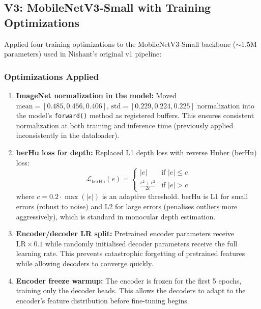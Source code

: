 \documentclass[11pt,a4paper]{article}
\begin{document}
\subsection{V3: MobileNetV3-Small with Training Optimizations}
\label{sec:vivek-v3}

Applied four training optimizations to the MobileNetV3-Small backbone
($\sim$1.5M parameters) used in Nishant's original v1 pipeline:

\subsubsection{Optimizations Applied}

\begin{enumerate}[nosep]
  \item \textbf{ImageNet normalization in the model:} Moved
    $\text{mean} = [0.485, 0.456, 0.406]$, $\text{std} = [0.229, 0.224, 0.225]$
    normalization into the model's \texttt{forward()} method as registered
    buffers. This ensures consistent normalization at both training and
    inference time (previously applied inconsistently in the dataloader).

  \item \textbf{berHu loss for depth:} Replaced L1 depth loss with reverse
    Huber (berHu) loss:
    \[
      \mathcal{L}_{\text{berHu}}(e) =
      \begin{cases}
        |e| & \text{if } |e| \leq c \\
        \frac{e^2 + c^2}{2c} & \text{if } |e| > c
      \end{cases}
    \]
    where $c = 0.2 \cdot \max(|e|)$ is an adaptive threshold. berHu is L1 for
    small errors (robust to noise) and L2 for large errors (penalises outliers
    more aggressively), which is standard in monocular depth estimation.

  \item \textbf{Encoder/decoder LR split:} Pretrained encoder parameters
    receive $\text{LR} \times 0.1$ while randomly initialised decoder
    parameters receive the full learning rate. This prevents catastrophic
    forgetting of pretrained features while allowing decoders to converge
    quickly.

  \item \textbf{Encoder freeze warmup:} The encoder is frozen for the first
    5 epochs, training only the decoder heads. This allows the decoders to
    adapt to the encoder's feature distribution before fine-tuning begins.
\end{enumerate}
\end{document}
